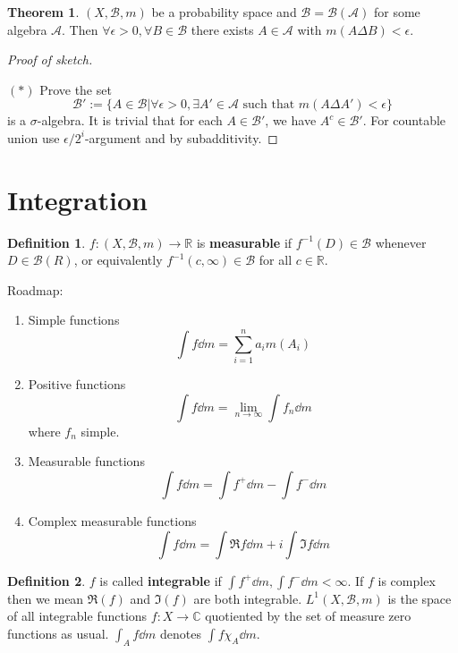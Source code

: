 \documentclass{article}
\theoremstyle{definition}
\newtheorem{thm}{Theorem}
\newtheorem{dfn}{Definition}
\newenvironment{proofs}[1][\proofname]{%
  \begin{proof}[#1]$ $\par\nobreak\ignorespaces
}{%
  \end{proof}
}
\newcommand{\CC}{\mathbb C}
\newcommand{\RR}{\mathbb R}
\begin{document}
\begin{thm}
	$(X, \mathscr{B}, m)$ be a probability space and $\mathscr{B} = \mathscr{B}(\mathscr{A})$ for some algebra $\mathscr{A}$.
	Then $\forall \epsilon > 0, \forall B \in \mathscr{B}$ there exists $A \in \mathscr{A}$ with $m(A \Delta B) < \epsilon$.
\end{thm}

\begin{proofs}[Proof of sketch]
	$(*)$
	Prove the set 
	\[
		\mathscr{B}' := \{A \in \mathscr{B}| \forall \epsilon > 0, \exists A' \in \mathscr{A} \text{ such that } m(A \Delta A') < \epsilon\}
	\]
	is a $\sigma$-algebra.
	It is trivial that for each $A \in \mathscr{B}'$, we have $A^c \in \mathscr{B}'$.
	For countable union use $\epsilon/2^i$-argument and by subadditivity.
\end{proofs}

\section{Integration}

\begin{dfn}
	$f: (X, \mathscr{B}, m) \to \RR$ is \textbf{measurable} if $f^{-1}(D) \in \mathscr{B}$ whenever $D \in \mathscr{B}(R)$, or equivalently $f^{-1}(c, \infty) \in \mathscr{B}$ for all $c \in \RR$.
\end{dfn}

Roadmap:
\begin{enumerate}
	\item Simple functions
		\[
			\int f \dd{m} = \sum_{i = 1}^n a_i m(A_i)
		\]

	\item Positive functions
		\[
			\int f \dd{m} = \lim_{n \to \infty} \int f_n \dd{m}
		\]
		where $f_n$ simple.

	\item Measurable functions
		\[
			\int f \dd{m} = \int f^+ \dd{m} - \int f^- \dd{m}
		\]

	\item Complex measurable functions
		\[
			\int f \dd{m} = \int \Re f \dd{m} + i \int \Im f \dd{m}
		\]
\end{enumerate}

\begin{dfn}
	$f$ is called \textbf{integrable} if $\int f^+ \dd{m}, \int f^- \dd{m} < \infty$.
	If $f$ is complex then we mean $\Re(f)$ and $\Im(f)$ are both integrable.
	$L^1(X, \mathscr{B}, m)$ is the space of all integrable functions $f: X \to \CC$ quotiented by the set of measure zero functions as usual.
	$\int_A f \dd{m}$ denotes $\int f \chi_A \dd{m}$.
\end{dfn}
\end{document}
